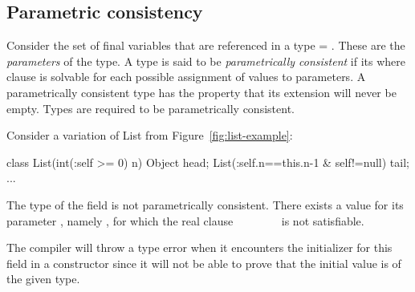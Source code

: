 \subsection{Parametric consistency}

Consider the set of final variables that are referenced in a
type  = . These are the {\em parameters} of
the type. A type is said to be {\em parametrically consistent}
if its where clause  is solvable for each possible assignment of
values to parameters.  A parametrically consistent type has the
property that its extension will never be empty. 
Types are required to be parametrically consistent.

Consider a variation of List from Figure~\ref{fig:list-example}:
\begin{displayxten}
class List(int(:self >= 0) n) {
  Object head;
  List(:self.n==this.n-1 & self!=null) tail;
  ...
}
\end{displayxten}
The type of the field  is not parametrically
consistent. There exists a value for its parameter , namely
, for which the real clause ~\xcd{!=}~ \xcd{&}
~\xcd{==}~ \xcd{&}
~\xcd{>=}~ is not satisfiable.

The compiler will throw a type error when it encounters the
initializer for this field in a constructor since it will not be able
to prove that the initial value is of the given type.


